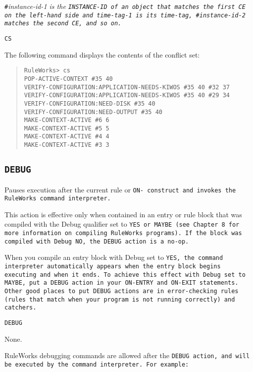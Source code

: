 \verb|#|\it{instance-id-1} is the \tt{INSTANCE-ID} of an object that matches
the first CE on the left-hand side and \it{time-tag-1} is its
time-tag, \verb|#|\it{instance-id-2} matches the second CE, and so on.

\Format

\tt{CS}

\Example

The following command displays the contents of the conflict set:

\begin{quote}
\begin{verbatim}
RuleWorks> cs
POP-ACTIVE-CONTEXT #35 40
VERIFY-CONFIGURATION:APPLICATION-NEEDS-KIWOS #35 40 #32 37
VERIFY-CONFIGURATION:APPLICATION-NEEDS-KIWOS #35 40 #29 34
VERIFY-CONFIGURATION:NEED-DISK #35 40
VERIFY-CONFIGURATION:NEED-OUTPUT #35 40
MAKE-CONTEXT-ACTIVE #6 6
MAKE-CONTEXT-ACTIVE #5 5
MAKE-CONTEXT-ACTIVE #4 4
MAKE-CONTEXT-ACTIVE #3 3
\end{verbatim}
\end{quote}

\subsection{\tt{DEBUG}}

Pauses execution after the current rule or \tt{ON-} construct and
invokes the RuleWorks command interpreter.

This action is effective only when contained in an entry or rule block
that was compiled with the Debug qualifier set to \tt{YES} or
\tt{MAYBE} (see Chapter 8 for more information on compiling RuleWorks
programs). If the block was compiled with Debug \tt{NO}, the
\tt{DEBUG} action is a no-op.

When you compile an entry block with Debug set to \tt{YES}, the
command interpreter automatically appears when the entry block begins
executing and when it ends. To achieve this effect with Debug set to
\tt{MAYBE}, put a \tt{DEBUG} action in your \tt{ON-ENTRY} and
\tt{ON-EXIT} statements. Other good places to put \tt{DEBUG} actions
are in error-checking rules (rules that match when your program is not
running correctly) and catchers.

\Format

\tt{DEBUG}

\Arguments

None.

\Example

RuleWorks debugging commands are allowed after the \tt{DEBUG} action,
and will be executed by the command interpreter. For example:

